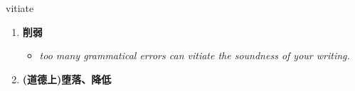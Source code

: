 
\begin{frame}
{\huge vitiate}
\begin{center}
\begin{enumerate}\Large
  \item \textbf{削弱}
  \begin{itemize}
    \item \em{\Large{too many grammatical errors can vitiate the soundness of your writing.}}
  \end{itemize}
  \item \textbf{(道德上)堕落、降低}
\end{enumerate}
\end{center}
\end{frame}
